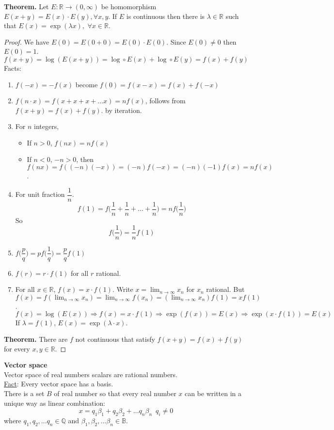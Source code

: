 \documentclass[10pt,letterpaper]{article}
\begin{document}
		
	\textbf{Theorem. } Let $E: \mathbb{R} \rightarrow (0, \infty)$ 
	be homomorphism $E(x + y) = E(x) \cdot E(y), \forall x, y$. 
	If $E$ is continuous then there is $\lambda \in \mathbb{R}$ such that
	$E(x) = \exp(\lambda x) , \,\, \forall x \in \mathbb{R}$.
	\begin{proof}
	We have $E(0) = E(0 + 0) = E(0) \cdot E(0)$.
	Since $E(0) \neq 0$ then $E(0) = 1$.
	$$f(x + y) = \log(E(x + y)) = \log \circ E(x) + \log \circ E(y) = f(x) + f(y)$$
	Facts:
	\begin{enumerate}[(1)]
		\item $f(-x) = -f(x)$ become $f(0) = f(x - x) = f(x) + f(-x)$
		\item $f(n \cdot x) = f(x + x + x + \ldots x) = nf(x)$, follows from $f(x + y) = f(x) + f(y)$.
		by iteration.
		\item For $n$ integers,
		\begin{itemize}
			\item If $n > 0$, $f(nx) = nf(x)$
			\item If $n < 0$, $-n > 0$,  then
			$f(nx) = f((-n)(-x)) = (-n)f(-x) = (-n)(-1)f(x) = nf(x)$.
		\end{itemize}
		\item For unit fraction $\dfrac{1}{n}$.	
		$$f(1) = f\bigg( \dfrac{1}{n} + \dfrac{1}{n} + \ldots + \dfrac{1}{n}\bigg)
		= nf\bigg(\dfrac{1}{n}\bigg)$$			
		So
		$$f\bigg(\dfrac{1}{n}\bigg) = \dfrac{1}{n} f(1)$$
		\item $f\bigg(\dfrac{p}{q}\bigg) = pf\bigg(\dfrac{1}{q}\bigg)
		= \dfrac{p}{q}f(1)$
		
		\item $f(r) = r \cdot f(1)$ for all $r$ rational.
		\item For all $x \in \mathbb{R}$, $f(x) = x \cdot f(1)$.			
		Write $x = \displaystyle\lim_{n\to \infty} x_n$ for $x_n$ rational. But
		$f(x) = f(\displaystyle\lim_{n\to \infty}x_n) = 
		\displaystyle\lim_{n\to \infty}f(x_n) = 
		(\displaystyle\lim_{n\to \infty}x_n) f(1) = xf(1)$.
		$$f(x) = \log(E(x)) \Rightarrow f(x) = x \cdot f(1) \Rightarrow
		\exp(f(x)) = E(x) \Rightarrow \exp(x \cdot f(1)) = E(x)$$
		If $\lambda = f(1)$, $E(x) = \exp(\lambda \cdot x)$.
	\end{enumerate}		
	\textbf{Theorem. } There are $f$ not continuous that satisfy $f(x+y) = f(x) + f(y)$
	for every $x, y \in \mathbb{R}$.
	
	
	
	
	\end{proof}

	\textbf{Vector space} \\
	Vector space of real numbers scalars are rational numbers.  \\
	\underline{Fact}: Every vector space has a basis. \\
	There is a set $B$ of real number so that every real number $x$ 
	can be written in a unique way as linear combination:
	$$x = q_1\beta_1 + q_2\beta_2 + \ldots q_n\beta_n \,\,\, q_i \neq 0$$
	where $q_1, q_2, \ldots q_n \in \mathbb{Q}$ and $\beta_1, \beta_2, \ldots \beta_n \in \mathbb{B}$. \\
	
\end{document}

